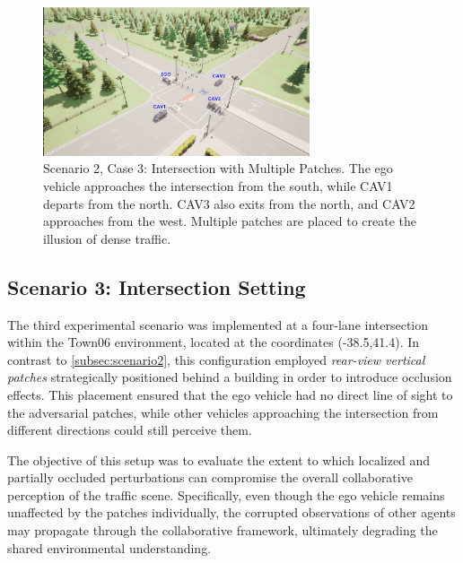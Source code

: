 \begin{figure}[H]
    \centering
    \includegraphics[width=0.7\textwidth]{figures/experiments/scenario2_v3.png}
    \caption{Scenario 2, Case 3: Intersection with Multiple Patches. The ego vehicle approaches the intersection from the south, while CAV1 departs from the north. CAV3 also exits from the north, and CAV2 approaches from the west. Multiple patches are placed to create the illusion of dense traffic.}
    \label{fig:scenario_intersection_case3}
\end{figure}

\subsection{Scenario 3: Intersection Setting}
\label{subsec:scenario3}

The third experimental scenario was implemented at a four-lane intersection within 
the Town06 environment, located at the coordinates (-38.5,41.4). In contrast to \ref{subsec:scenario2},
this configuration employed \textit{rear-view vertical patches} strategically positioned behind a building in order to introduce 
occlusion effects. This placement ensured that the ego vehicle had no direct line of sight 
to the adversarial patches, while other vehicles approaching the intersection from 
different directions could still perceive them.  

The objective of this setup was to evaluate the extent to which localized and 
partially occluded perturbations can compromise the overall collaborative perception 
of the traffic scene. Specifically, even though the ego vehicle remains unaffected 
by the patches individually, the corrupted observations of other agents may 
propagate through the collaborative framework, ultimately degrading the shared 
environmental understanding.  

